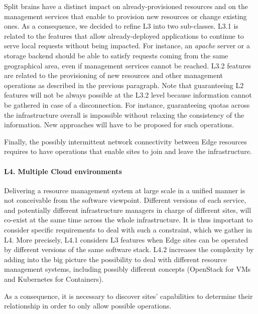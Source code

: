 Split brains have a distinct impact on already-provisioned resources and on the
management services that enable to provision new resources or change existing
ones. As a consequence, we decided to refine L3 into two sub-classes. L3.1 is
related to the features that allow already-deployed applications to continue to
serve local requests without being impacted. For instance, an \emph{apache}
server or a storage backend should be able to satisfy requests coming from the
same geographical area, even if management services cannot be reached. L3.2
features are related to the provisioning of new resources and other management
operations as described in the previous paragraph.
%
Note that guaranteeing L2 features will not be always possible at the L3.2
level because information cannot be gathered in case of a disconnection. For
instance, guaranteeing quotas across the infrastructure overall is impossible
without relaxing the consistency of the information. New approaches will have
to be proposed for such operations.

Finally, the possibly intermittent network connectivity between Edge resources
requires to have operations that enable sites to join and leave the
infrastructure.


\paragraph{L4. Multiple Cloud environments}
Delivering a resource management system at large scale in a unified manner is
not conceivable from the software viewpoint. Different versions of each
service, and potentially different infrastructure managers in charge of
different sites, will co-exist at the same time across the whole
infrastructure. It is thus important to consider specific requirements to deal
with such a constraint, which we gather in L4.
%
More precisely, L4.1 considers L3 features when Edge sites can be
operated by different versions of the same software stack.
%
L4.2 increases the complexity by adding into the big picture the
possibility to deal with different resource management systems,
including possibly different concepts (\eg OpenStack for VMs and
Kubernetes for Containers).

As a consequence, it is necessary to discover sites' capabilities to
determine their relationship in order to only allow possible operations.

